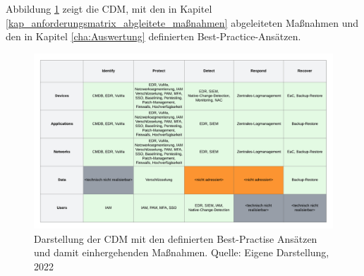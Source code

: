 \bigbreak
Abbildung \ref{fig:CDM-self} zeigt die CDM, mit den in Kapitel \ref{kap_anforderungsmatrix_abgleitete_maßnahmen} abgeleiteten Maßnahmen und den in Kapitel \ref{cha:Auswertung} definierten Best-Practice-Ansätzen.  

\begin{figure}[H]
    \centering
 \includegraphics[width=\linewidth]{images/uploads/a_figure_14.png}
  \caption{Darstellung der CDM mit den definierten Best-Practise Ansätzen und damit einhergehenden Maßnahmen. Quelle: Eigene Darstellung, 2022}
  \label{fig:CDM-self}
\end{figure}
\bigbreak